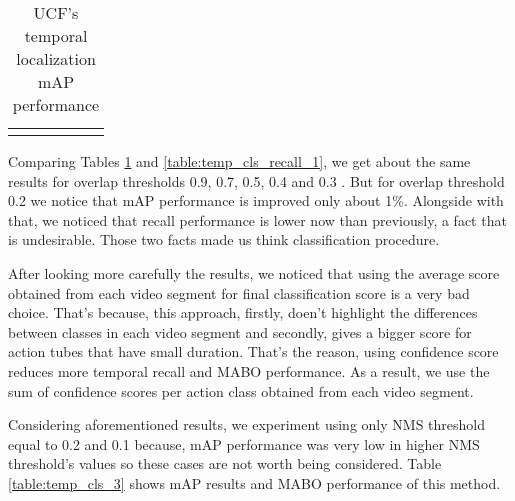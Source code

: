 \begin{center}
\begin{longtable}{|| c | c || c c c | c ||}
    \hline

    \caption{UCF's temporal localization mAP performance}
    \label{table:temp_cls_2}
  \end{longtable}
\end{center}

Comparing Tables \ref{table:temp_cls_2} and \ref{table:temp_cls_recall_1}, we get about the same results for overlap thresholds 0.9, 0.7, 0.5, 0.4 and
0.3 . But for overlap threshold 0.2 we notice that mAP performance is improved  only about 1\%. Alongside with that, we noticed that recall performance is lower now than previously, a fact
that is undesirable. Those two facts made us think classification procedure. \par


After looking more carefully the results, we noticed that using  the average score obtained from each video segment for final classification score is a very bad choice. That's because,
this approach, firstly, doen't highlight the differences between classes in each video segment and secondly, gives a bigger score for action tubes that have small duration. That's the
reason, using confidence score reduces more temporal recall and MABO performance. As a result, we use the sum of confidence scores per action class obtained from each video segment. \par

Considering aforementioned results, we experiment using only NMS threshold equal to 0.2 and 0.1 because, mAP performance was very low in higher NMS threshold's values so these cases
are not worth being considered. Table \ref{table:temp_cls_3} shows mAP results and MABO performance of this method.

